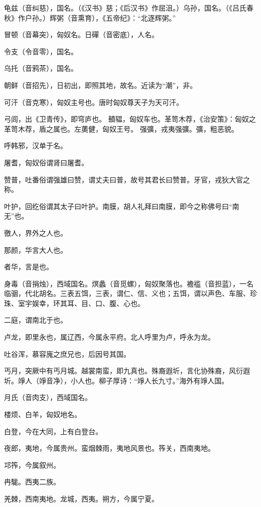 \documentclass[a4paper,12pt,UTF8,twoside]{ctexbook}
\begin{document}
    龟兹（音纠慈），国名。（《汉书》慈；《后汉书》作屈沮。）乌孙，国名。（《吕氏春秋》作户孙。）辉粥（音熏育），《五帝纪》：“北逐辉粥。”
    
    冒顿（音幕突），匈奴名。日磾（音密底），人名。
    
    令支（令音零），国名。
    
    乌托（音鸦茶），国名。
    
    朝鲜（音招先），日初出，即照其地，故名。近读为“潮”，非。
    
    可汗（音克寒），匈奴主号也。唐时匈奴尊天子为天可汗。
    
    弓闾，出《卫青传》，即穹庐也。 轒辒，匈奴车也。革笥木荐，《治安策》：匈奴之革笥木荐，盾之属也。左薁健，匈奴王号。 强彍，戎夷强彍。彍，粗恶貌。
    
    呼韩邪，汉单于名。
    
    屠耆，匈奴俗谓肾曰屠耆。
    
    赞普，吐番俗谓强雄曰赞，谓丈夫曰普，故号其君长曰赞普。牙官，戎狄大官之称。
    
    叶护，回纥俗谓其太子曰叶护。南膜，胡人礼拜曰南膜，即今之称佛号曰“南无”也。
    
    徼人，界外之人也。
    
    那颜，华言大人也。
    
    者华，言是也。
    
    身毒（音捐烛），西域国名。熐蠡（音觅螺），匈奴聚落也。襜褴（音担蓝），一名临骃，代北胡名。三表五饵，三表，谓仁、信、义也；五饵，谓以声色、车服、珍珠、室宇娱幸，环其耳、目、口、腹、心也。
    
    二庭，谓南北于也。
    
    卢龙，即里永也，属辽西，今属永平府。北人呼里为卢，呼永为龙。
    
    吐谷浑，慕容廆之庶兄也，后因号其国。
    
    丐月，突厥中有丐月城。越裳南蛮，即九真也。殊裔遐圻，言化协殊裔，风衍遐圻。竫人（竫音净），小人也。柳子厚诗：“竫人长九寸。”海外有竫人国。
    
    月氏（音肉支），西域国名。
    
    楼烦、白羊，匈奴地名。
    
    白登，今在大同，上有白登台。
    
    夜郎，夷地，今属贵州。蛮烟棘雨，夷地风景也。筰关，西南夷地。
    
    邛筰，今属叙州。
    
    冉駹。西夷二族。
    
    羌棘，西南夷地。龙城，西夷。朔方，今属宁夏。
    
\end{document}
